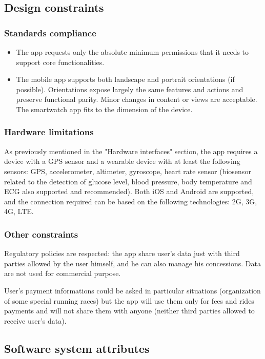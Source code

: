 \subsection{Design constraints}
\subsubsection{Standards compliance}
\begin{itemize}
\item The app requests only the absolute minimum permissions that it needs to support core functionalities.
\item The mobile app supports both landscape and portrait orientations (if possible). Orientations expose largely the same features and actions and preserve functional parity. Minor changes in content
or views are acceptable. The smartwatch app fits to the dimension of the device.
\end{itemize}

\subsubsection{Hardware limitations}
As previously mentioned in the "Hardware interfaces" section, the app requires a device with a GPS sensor and a wearable device with at least the following sensors: GPS, accelerometer, altimeter, gyroscope, heart rate sensor (biosensor related to the detection of glucose level, blood pressure, body temperature and ECG also supported and recommended). Both iOS and Android are supported, and the connection required can be based on the following technologies: 2G, 3G, 4G, LTE.

\subsubsection{Other constraints}
Regulatory policies are respected: the app share user's data just with third parties allowed by the user himself, and he can also manage his concessions. Data are not used for commercial purpose.

User's payment informations could be asked in particular situations (organization of some special running races) but the app will use them only for fees and rides payments and will not share them with anyone (neither third parties allowed to receive user's data).

\subsection{Software system attributes}
